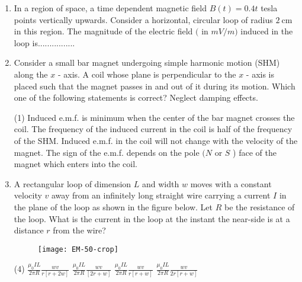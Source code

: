 \begin{enumerate}[ label=\color{ocre}\textbf{\arabic*.}]
	
	\item In a region of space, a time dependent magnetic field $B(t)=0.4 t$ tesla points vertically upwards. Consider a horizontal, circular loop of radius $2 \mathrm{~cm}$ in this region. The magnitude of the electric field $($ in $m V / m)$ induced in the loop is................{}
	\item Consider a small bar magnet undergoing simple harmonic motion (SHM) along the $x$ - axis. A coil whose plane is perpendicular to the $x$ - axis is placed such that the magnet passes in and out of it during its motion. Which one of the following statements is correct? Neglect damping effects. {}
	\begin{tasks}(1)
		\task[\textbf{a.}]Induced e.m.f. is minimum when the center of the bar magnet crosses the coil.
		\task[\textbf{b.}]The frequency of the induced current in the coil is half of the frequency of the SHM.
		\task[\textbf{c.}]Induced e.m.f. in the coil will not change with the velocity of the magnet.
		\task[\textbf{d.}] The sign of the e.m.f. depends on the pole $(N$ or $S$ ) face of the magnet which enters into the coil.
	\end{tasks}
	\item A rectangular loop of dimension $L$ and width $w$ moves with a constant velocity $v$ away from an infinitely long straight wire carrying a current $I$ in the plane of the loop as shown in the figure below. Let $R$ be the resistance of the loop. What is the current in the loop at the instant the near-side is at a distance $r$ from the wire?{}
	\begin{figure}[H]
		\begin{center}
			\texttt{[image: EM-50-crop]}
		\end{center}
	\end{figure}
	\begin{tasks}(4)
		\task[\textbf{a.}] $\frac{\mu_{0} I L}{2 \pi R} \frac{w v}{r[r+2 w]}$
		\task[\textbf{b.}] $\frac{\mu_{0} I L}{2 \pi R} \frac{w v}{[2 r+w]}$
		\task[\textbf{c.}] $\frac{\mu_{0} I L}{2 \pi R} \frac{w v}{r[r+w]}$
		\task[\textbf{d.}]$\frac{\mu_{0} I L}{2 \pi R} \frac{w v}{2 r[r+w]}$
	\end{tasks}
	

\end{enumerate}
